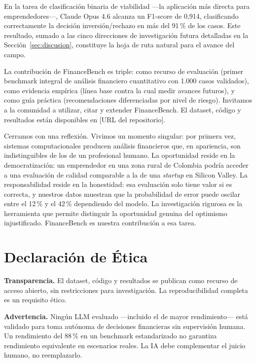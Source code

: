 \documentclass[12pt,a4paper]{article}
\begin{document}
En la tarea de clasificación binaria de viabilidad ---la aplicación más directa para emprendedores---, Claude Opus 4.6 alcanza un F1-score de 0,914, clasificando correctamente la decisión inversión/rechazo en más del 91\,\% de los casos. Este resultado, sumado a las cinco direcciones de investigación futura detalladas en la Sección~\ref{sec:discusion}, constituye la hoja de ruta natural para el avance del campo.

La contribución de FinanceBench es triple: como recurso de evaluación (primer benchmark integral de análisis financiero cuantitativo con 1.000 casos validados), como evidencia empírica (línea base contra la cual medir avances futuros), y como guía práctica (recomendaciones diferenciadas por nivel de riesgo). Invitamos a la comunidad a utilizar, citar y extender FinanceBench. El dataset, código y resultados están disponibles en [URL del repositorio].

Cerramos con una reflexión. Vivimos un momento singular: por primera vez, sistemas computacionales producen análisis financieros que, en apariencia, son indistinguibles de los de un profesional humano. La oportunidad reside en la democratización: un emprendedor en una zona rural de Colombia podría acceder a una evaluación de calidad comparable a la de una \textit{startup} en Silicon Valley. La responsabilidad reside en la honestidad: esa evaluación solo tiene valor si es correcta, y nuestros datos muestran que la probabilidad de error puede oscilar entre el 12\,\% y el 42\,\% dependiendo del modelo. La investigación rigurosa es la herramienta que permite distinguir la oportunidad genuina del optimismo injustificado. FinanceBench es nuestra contribución a esa tarea.

\section*{Declaración de Ética}

\textbf{Transparencia.} El dataset, código y resultados se publican como recurso de acceso abierto, sin restricciones para investigación. La reproducibilidad completa es un requisito ético.

\textbf{Advertencia.} Ningún LLM evaluado ---incluido el de mayor rendimiento--- está validado para toma autónoma de decisiones financieras sin supervisión humana. Un rendimiento del 88\,\% en un benchmark estandarizado no garantiza rendimiento equivalente en escenarios reales. La IA debe complementar el juicio humano, no reemplazarlo.
\end{document}

